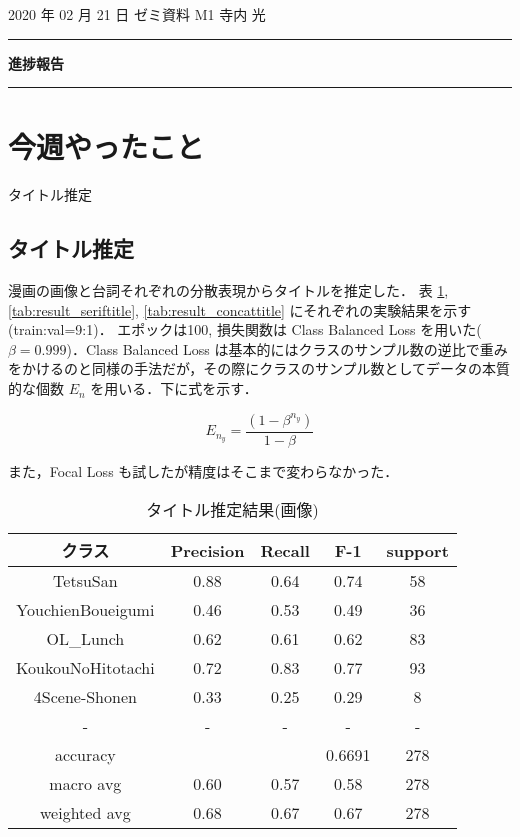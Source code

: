 \documentclass[onecolumn]{ujarticle}   %
\begin{document}
	\noindent

	\hspace{1em}
	2020 年 02 月 21 日
	ゼミ資料
	\hfill
	M1 寺内 光

	\vspace{2mm}

	\hrule

	\begin{center}
		{\Large \bf 進捗報告}
	\end{center}


	\hrule
	\vspace{3mm}

	\section{今週やったこと}
	\begin{itemize}{
		\item{タイトル推定}
	}
	\end{itemize}

	\subsection{タイトル推定}
	漫画の画像と台詞それぞれの分散表現からタイトルを推定した．
	表 \ref{tab:result_imgtitle}, \ref{tab:result_seriftitle}, \ref{tab:result_concattitle} にそれぞれの実験結果を示す(train:val=9:1)．
	エポックは100, 損失関数は Class Balanced Loss を用いた($\beta=0.999$)．Class Balanced Loss は基本的にはクラスのサンプル数の逆比で重みをかけるのと同様の手法だが，その際にクラスのサンプル数としてデータの本質的な個数 $E_{n}$ を用いる．下に式を示す．

	\begin{equation}{
		E_{n_{y}} = \frac{(1-\beta^{n_{y}})}{1-\beta}
	}\end{equation}

	また，Focal Loss も試したが精度はそこまで変わらなかった．

	\begin{table}[h]
		\vspace{-3mm}
		\centering
		\caption{タイトル推定結果(画像)}
		\label{tab:result_imgtitle}
		\begin{tabular}{|c|c|c|c|c|} \hline
			クラス&Precision&Recall&F-1&support\\ \hline\hline
			TetsuSan&0.88&0.64&0.74&58\\ \hline
			YouchienBoueigumi&0.46&0.53&0.49&36\\ \hline
			OL\_Lunch&0.62&0.61&0.62&83\\ \hline
			KoukouNoHitotachi&0.72&0.83&0.77&93\\ \hline
			4Scene-Shonen&0.33&0.25&0.29&8\\ \hline
			-&-&-&-&-\\ \hline
			accuracy&&&0.6691&278\\ \hline
			macro avg&0.60&0.57&0.58&278\\ \hline
			weighted avg&0.68&0.67&0.67&278\\ \hline
		\end{tabular}
	\end{table}
\end{document}
